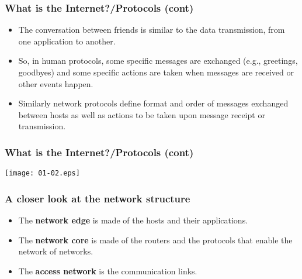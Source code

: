 %
\begin{frame}
\frametitle{What is the Internet?/Protocols (cont)}

\begin{itemize}
 
  \item The conversation between friends is similar to the data
  transmission, from one application to another.

  \item So, in human protocols, some specific messages are exchanged
  (e.g., greetings, goodbyes) and some specific actions are taken when
  messages are received or other events happen.

  \item Similarly network protocols define format and order of
    messages exchanged between hosts as well as actions to be taken
    upon message receipt or transmission.

\end{itemize}

\end{frame}

%
\begin{frame}
\frametitle{What is the Internet?/Protocols (cont)}
\label{protocols}

\begin{center}
\texttt{[image: 01-02.eps]}
\end{center}  
 
\end{frame}

%
\begin{frame}
\frametitle{A closer look at the network structure}

\begin{itemize}

  \item The \textbf{network edge} is made of the hosts and their
  applications. 

  \item The \textbf{network core} is made of the routers and the
  protocols that enable the network of networks.

  \item The \textbf{access network} is the communication links.

\end{itemize}

\end{frame}
